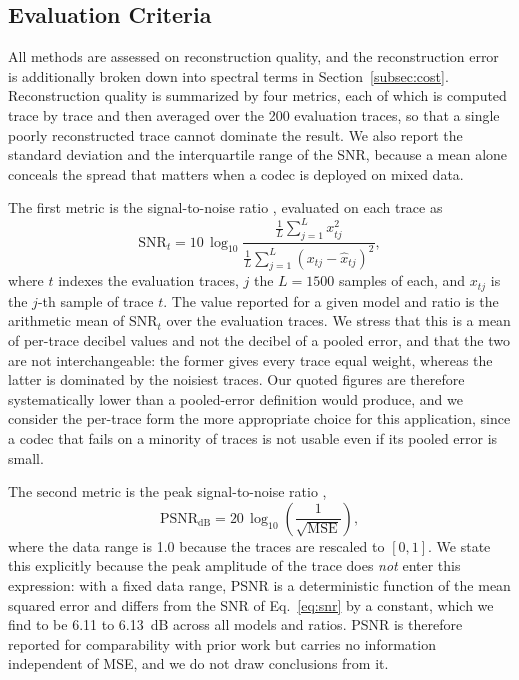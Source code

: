 \documentclass[fleqn,10pt]{wlscirep}
\begin{document}
\subsection{Evaluation Criteria}
\label{subsec:evaluation}

All methods are assessed on reconstruction quality, and the reconstruction error is additionally broken down into spectral terms in Section~\ref{subsec:cost}. Reconstruction quality is summarized by four metrics, each of which is computed trace by trace and then averaged over the 200 evaluation traces, so that a single poorly reconstructed trace cannot dominate the result. We also report the standard deviation and the interquartile range of the SNR, because a mean alone conceals the spread that matters when a codec is deployed on mixed data.

The first metric is the signal-to-noise ratio \cite{oppenheim1997signals}, evaluated on each trace as
\begin{equation}
\label{eq:snr}
\mathrm{SNR}_t = 10 \, \log_{10} \frac{\frac{1}{L}\sum_{j=1}^{L} x_{tj}^{2}}
                                          {\frac{1}{L}\sum_{j=1}^{L} (x_{tj} - \hat{x}_{tj})^{2}} ,
\end{equation}
where $t$ indexes the evaluation traces, $j$ the $L = 1500$ samples of each, and $x_{tj}$ is the $j$-th sample of trace $t$. The value reported for a given model and ratio is the arithmetic mean of $\mathrm{SNR}_t$ over the evaluation traces. We stress that this is a mean of per-trace decibel values and not the decibel of a pooled error, and that the two are not interchangeable: the former gives every trace equal weight, whereas the latter is dominated by the noisiest traces. Our quoted figures are therefore systematically lower than a pooled-error definition would produce, and we consider the per-trace form the more appropriate choice for this application, since a codec that fails on a minority of traces is not usable even if its pooled error is small.

The second metric is the peak signal-to-noise ratio \cite{jahne2005digital},
\begin{equation}
\mathrm{PSNR}_{\mathrm{dB}} = 20 \, \log_{10} \left( \frac{1}{\sqrt{\mathrm{MSE}}} \right),
\end{equation}
where the data range is 1.0 because the traces are rescaled to $[0,1]$. We state this explicitly because the peak amplitude of the trace does \emph{not} enter this expression: with a fixed data range, PSNR is a deterministic function of the mean squared error and differs from the SNR of Eq.~\eqref{eq:snr} by a constant, which we find to be 6.11 to 6.13~dB across all models and ratios. PSNR is therefore reported for comparability with prior work but carries no information independent of MSE, and we do not draw conclusions from it.
\end{document}

